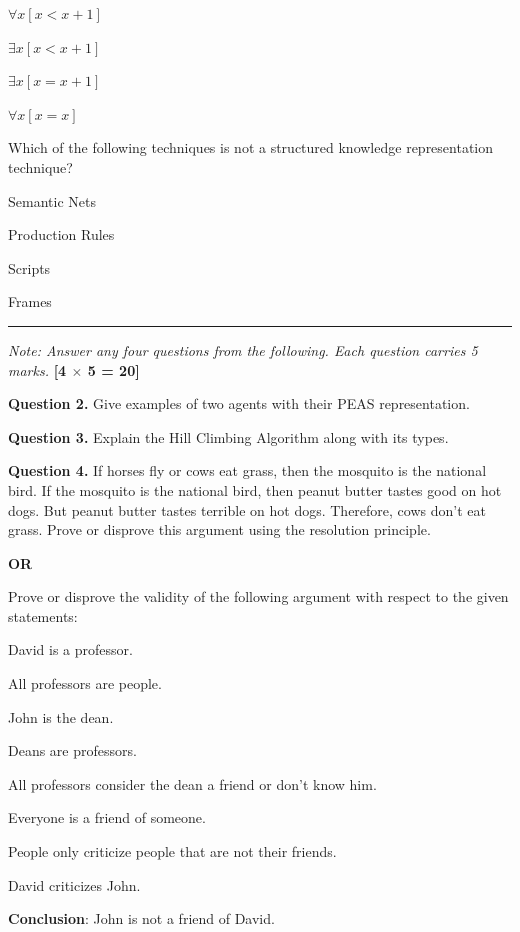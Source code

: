 \documentclass[11pt,a4paper]{article}
\begin{document}
\begin{parts}
\begin{parts}
    \item $\forall x [x < x+1]$
    \item $\exists x [x < x+1]$
    \item $\exists x [x = x+1]$
    \item $\forall x [x = x]$
  \end{parts}
  \item Which of the following techniques is not a structured knowledge representation technique?
  
\begin{parts}
    \item Semantic Nets
    \item Production Rules
    \item Scripts
    \item Frames
  \end{parts}
\end{parts}

\bigskip


\rule{\linewidth}{0.4pt}\smallskip




\noindent   \textit{Note: Answer any four questions from the following. Each question carries 5 marks.} \hfill   \textbf{[4 $ \times$ 5 = 20]}

\medskip


\noindent   \textbf{Question 2.} Give examples of two agents with their PEAS representation.

\medskip


\noindent   \textbf{Question 3.} Explain the Hill Climbing Algorithm along with its types.

\medskip


\noindent   \textbf{Question 4.} If horses fly or cows eat grass, then the mosquito is the national bird. If the mosquito is the national bird, then peanut butter tastes good on hot dogs. But peanut butter tastes terrible on hot dogs. Therefore, cows don't eat grass. Prove or disprove this argument using the resolution principle.
\centerline{   \textbf{OR}}
Prove or disprove the validity of the following argument with respect to the given statements:

\begin{parts}
  \item David is a professor.
  \item All professors are people.
  \item John is the dean.
  \item Deans are professors.
  \item All professors consider the dean a friend or don't know him.
  \item Everyone is a friend of someone.
  \item People only criticize people that are not their friends.
  \item David criticizes John.
  \item   \textbf{Conclusion}: John is not a friend of David.
\end{parts}
\end{document}
